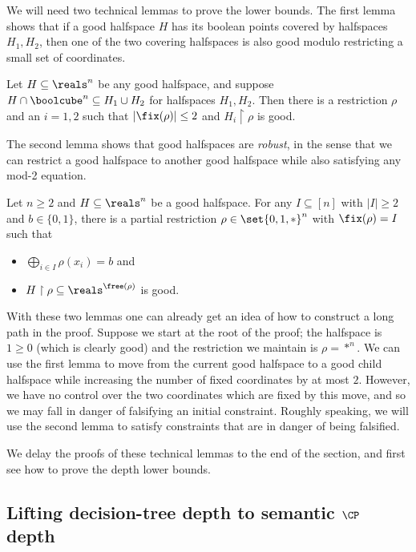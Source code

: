 We will need two technical lemmas to prove the lower bounds.
The first lemma shows that if a good halfspace $H$ has its boolean points covered by halfspaces $H_1, H_2$, then one of the two covering halfspaces is also good modulo restricting a small set of coordinates.
\begin{lemma}\label{lem:crux}
	Let $H \subseteq \reals^n$ be any good halfspace, and suppose $H \cap \boolcube^n \subseteq H_1 \cup H_2$ for halfspaces $H_1, H_2$.
	Then there is a restriction $\rho$ and an $i = 1,2$ such that $|\fix(\rho)| \leq 2$ and $H_i \restriction \rho$ is good.
\end{lemma}

The second lemma shows that good halfspaces are \emph{robust}, in the sense that we can restrict a good halfspace to another good halfspace while also satisfying any mod-2 equation.
\begin{lemma}\label{lem:consistent-restriction}
	Let $n \geq 2$ and $H \subseteq \reals^n$ be a good halfspace.
	For any $I \subseteq [n]$ with $|I| \geq 2$ and $b \in \{0,1\}$, there is a partial restriction $\rho \in \set{0,1,*}^n$ with $\fix(\rho) = I$ such that 
\begin{itemize}
	\item $\displaystyle{\bigoplus_{i \in I} \rho(x_i) = b}$ and
	\item $H \restriction \rho \subseteq \reals^{\free(\rho)}$ is good.
\end{itemize}
\end{lemma}

With these two lemmas one can already get an idea of how to construct a long path in the proof.
Suppose we start at the root of the proof; the halfspace is $1 \geq 0$ (which is clearly good) and the restriction we maintain is $\rho = *^n$.
We can use the first lemma to move from the current good halfspace to a good child halfspace while increasing the number of fixed coordinates by at most $2$.
However, we have no control over the two coordinates which are fixed by this move, and so we may fall in danger of falsifying an initial constraint.
Roughly speaking, we will use the second lemma to satisfy constraints that are in danger of being falsified.

We delay the proofs of these technical lemmas to the end of the section, and first see how to prove the depth lower bounds.


%
\subsection{Lifting decision-tree depth to semantic    %
  \texorpdfstring{$\CP$}{CP} depth} 

